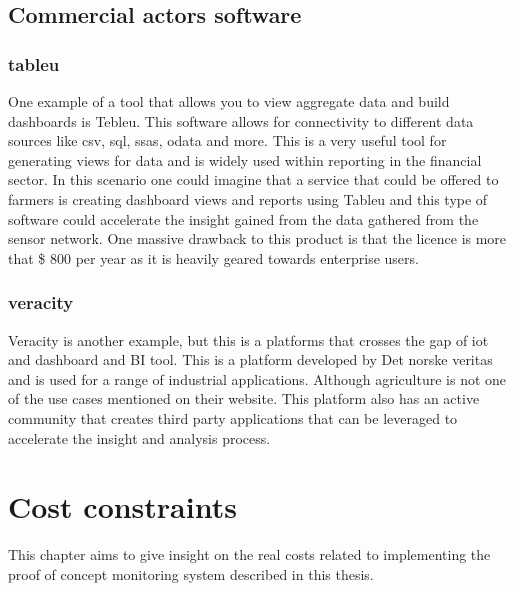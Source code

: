 \documentclass[]{uiophd}
\begin{document}
\section{Commercial actors software}

\subsection{tableu}
One example of a tool that allows you to view aggregate data and build dashboards is Tebleu. This software allows for connectivity to different data sources like csv, sql, ssas, odata and more. This is a very useful tool for generating views for data and is widely used within reporting in the financial sector. In this scenario one could imagine that a service that could be offered to farmers is creating dashboard views and reports using Tableu and  this type of software could accelerate the insight gained from the data gathered from the sensor network. One massive drawback to this product is that the licence is more that \$ 800 per year as it is heavily geared towards enterprise users.\cite{tableu}

\subsection{veracity}
Veracity is another example, but this is a platforms that crosses the gap of iot and dashboard and BI tool. This is a platform developed by Det norske veritas and is used for a range of industrial applications. Although agriculture is not one of the use cases mentioned on their website. This platform also has an active community that creates third party applications that can be leveraged to accelerate the insight and analysis process. \cite{veracity}

\chapter{Cost constraints}

This chapter aims to give insight on the real costs related to implementing the proof of concept monitoring system described in this thesis.
\end{document}
